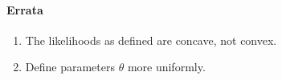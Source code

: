 \begin{abstract} 
\end{abstract} 

\paragraph{Errata}
\begin{enumerate}
  \item The likelihoods as defined are concave, not convex.
  \item Define parameters $\theta$ more uniformly.
\end{enumerate}


